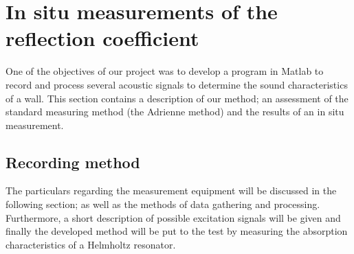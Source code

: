 \begin{comment}
\documentclass[12pt,a4paper]{article}
\usepackage{a4wide}
\usepackage{amsfonts, amsmath, amsthm}
\usepackage[english]{babel}
\usepackage{framed}
\usepackage[pdftex]{graphicx}
\usepackage{epstopdf}
\usepackage[font=small,format=plain,labelfont=bf,up,textfont=it,up]{caption}
\usepackage{wrapfig}
\usepackage{tocloft}
\usepackage{psfrag}
\usepackage{subfig}
\usepackage[latin1]{inputenc}
\usepackage{verbatim}

\usepackage{bbm}
\topmargin -15mm
\textwidth 16truecm
\textheight 24truecm
\setlength\parindent{0pt}
\setlength\parskip{0.20in plus0.05in minus0.05in}
\newcommand{\Z}{\mathbb{Z}}
\newcommand{\N}{\mathbb{N}}
\newcommand{\R}{\mathbb{R}}
\newcommand{\C}{\mathbb{C}}
\newcommand{\eps}{\varepsilon}
\fboxrule 1pt
\fboxsep 7pt
\pagenumbering{arabic}







\end{comment}


\section{In situ measurements of the reflection coefficient}
One of the objectives of our project was to develop a program in Matlab to record and process several acoustic signals to determine the sound characteristics of a wall. 
This section contains a description of our method; an assessment of the standard measuring method (the Adrienne method) and the results of an in situ measurement. 

\subsection{Recording method}
The particulars regarding the measurement equipment will be discussed in the following section; as well as the methods of data gathering and processing. Furthermore, a short description of possible excitation signals will be given and finally the developed method will be put to the test by measuring the absorption characteristics of a Helmholtz resonator.

